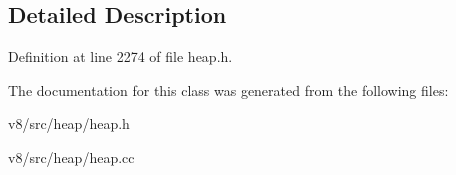 \subsection{Detailed Description}


Definition at line 2274 of file heap.\+h.



The documentation for this class was generated from the following files\+:\begin{DoxyCompactItemize}
\item 
v8/src/heap/heap.\+h\item 
v8/src/heap/heap.\+cc\end{DoxyCompactItemize}
